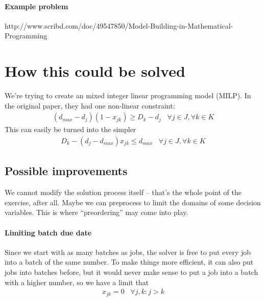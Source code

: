 \documentclass[13pt, letterpaper, twoside]{book}
\begin{document}
\paragraph*{Example problem} 
http://www.scribd.com/doc/49547850/Model-Building-in-Mathematical-Programming

\pagebreak
\section{How this could be solved}
We're trying to create an mixed integer linear programming model (MILP). In the original paper, they had one non-linear constraint:
\begin{align}
  (d_{max}-d_j)(1-x_{jk}) \geq D_k-d_j \;\;\;\forall j \in J, \forall k \in K
\end{align}
This can easily be turned into the simpler
\begin{align}
  D_k - (d_j - d_{max})x_{jk} \leq d_{max} \;\;\;\forall j \in J, \forall k \in K
\end{align}
\subsection{Possible improvements}
We cannot modify the solution process itself -- that's the whole point of the exercise, after all. Maybe we can preprocess to limit the domains of some decision variables. This is where ``preordering'' may come into play.
\paragraph{Limiting batch due date}
Since we start with as many batches as jobs, the solver is free to put every job into a batch of the same number. To make things more efficient, it can also put jobs into batches before, but it would never make sense to put a job into a batch with a higher number, so we have a limit that
\begin{align}
  x_{jk} = 0 \;\;\; \forall j,k: j > k
\end{align}
\end{document}
